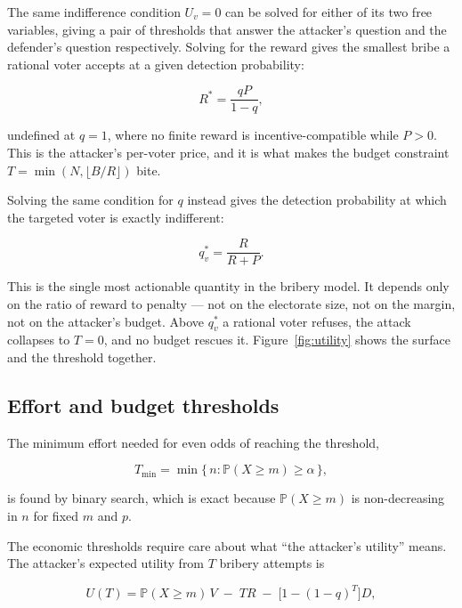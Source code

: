 \documentclass[11pt,a4paper]{article}
\newcommand{\Prob}{\mathbb{P}}
\newcommand{\Uv}{U_{v}}
\newcommand{\figref}[1]{Figure~\ref{#1}}
\begin{document}
The same indifference condition $\Uv = 0$ can be solved for either of its two free
variables, giving a pair of thresholds that answer the attacker's question and the
defender's question respectively. Solving for the reward gives the smallest bribe a
rational voter accepts at a given detection probability:

\begin{equation}
R^{*} = \frac{qP}{1-q},
\label{eq:t1}
\end{equation}

undefined at $q = 1$, where no finite reward is incentive-compatible while $P > 0$. This
is the attacker's per-voter price, and it is what makes the budget constraint
$T = \min(N, \lfloor B/R \rfloor)$ bite.

Solving the same condition for $q$ instead gives the detection probability
at which the targeted voter is exactly indifferent:

\begin{equation}
q_v^{*} = \frac{R}{R + P} .
\label{eq:t2}
\end{equation}

This is the single most actionable quantity in the bribery model. It depends only on
the ratio of reward to penalty --- not on the electorate size, not on the margin, not on
the attacker's budget. Above $q_v^{*}$ a rational voter refuses, the attack collapses to
$T = 0$, and no budget rescues it. \figref{fig:utility} shows the surface and the
threshold together.

\subsection{Effort and budget thresholds}

The minimum effort needed for even odds of reaching the threshold,

\begin{equation}
T_{\min} = \min \{\, n : \Prob(X \geq m) \geq \alpha \,\},
\label{eq:t3}
\end{equation}

is found by binary search, which is exact because $\Prob(X \geq m)$ is non-decreasing in
$n$ for fixed $m$ and $p$.

The economic thresholds require care about what ``the attacker's utility'' means. The
attacker's expected utility from $T$ bribery attempts is

\begin{equation}
U(T) = \Prob(X \geq m)\, V \;-\; T R \;-\; \big[1 - (1-q)^{T}\big] D,
\label{eq:utility}
\end{equation}
\end{document}
